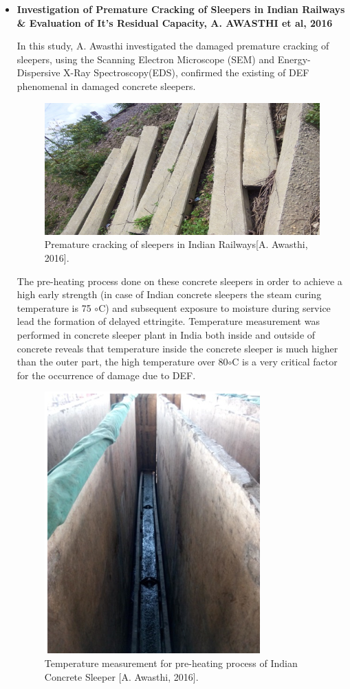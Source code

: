 \begin{itemize}
    \item
    \textbf{Investigation of Premature Cracking of Sleepers in Indian Railways \& Evaluation of It's Residual Capacity, A. AWASTHI et al, 2016}

      In this study, A. Awasthi\cite{Awasthi} investigated the damaged premature cracking of sleepers, using the Scanning Electron Microscope (SEM) and Energy-Dispersive X-Ray Spectroscopy(EDS), confirmed the existing of DEF phenomenal in damaged concrete sleepers.

      \begin{figure}[ht!]
          \centering
          \includegraphics[width=.6\linewidth]{Files/Background/Anupam_3.png}
          \caption{Premature cracking of sleepers in Indian Railways[A. Awasthi, 2016].}
          \label{fig:Awasthi_3}
      \end{figure}

      The pre-heating process done on these concrete sleepers in order to achieve a high early strength (in case of Indian concrete sleepers the steam curing temperature is 75 $\circ$C) and subsequent exposure to moisture during service lead the formation of delayed ettringite. Temperature measurement was performed in concrete sleeper plant in India both inside and outside of concrete reveals that temperature inside the concrete sleeper is much higher than the outer part, the high temperature over 80$\circ$C is a very critical factor for the occurrence of damage due to DEF.

      \begin{figure}[ht!]
          \centering
          \includegraphics[width=.4\linewidth]{Files/Background/Anupam_4.png}
          \caption{Temperature measurement for pre-heating process of Indian Concrete Sleeper [A. Awasthi, 2016].}
          \label{fig:Awasthi_4}
      \end{figure}


\end{itemize}
